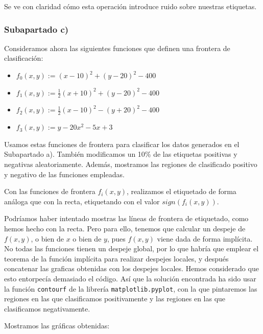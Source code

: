 \documentclass[11pt]{article}
\begin{document}
Se ve con claridad cómo esta operación introduce ruido sobre nuestras etiquetas.

\subsubsection{Subapartado c)}

Consideramos ahora las siguientes funciones que definen una frontera de clasificación:

\begin{itemize}
    \item $f_0(x, y):= (x - 10)^2 + (y - 20)^2 - 400$
    \item $f_1(x, y):= \frac{1}{2} (x + 10)^2 + (y - 20)^2 - 400$
    \item $f_2(x, y):= \frac{1}{2} (x - 10)^2 - (y + 20)^2 - 400$
    \item $f_3(x, y):= y - 20x^2 -5x +3$
\end{itemize}

Usamos estas funciones de frontera para clasificar los datos generados en el Subapartado a). También modificamos un 10\% de las etiquetas positivas y negativas aleatoriamente. Además, mostramos las regiones de clasificado positivo y negativo de las funciones empleadas.

Con las funciones de frontera $f_i(x, y)$, realizamos el etiquetado de forma análoga que con la recta, etiquetando con el valor $sign(f_i(x,y))$.

Podríamos haber intentado mostras las líneas de frontera de etiquetado, como hemos hecho con la recta. Pero para ello, tenemos que calcular un despeje de $f(x, y)$, o bien de $x$ o bien de $y$, pues $f(x, y)$ viene dada de forma implícita. No todas las funciones tienen un despeje global, por lo que habría que emplear el teorema de la función implícita para realizar despejes locales, y después concatenar las graficas obtenidas con los despejes locales. Hemos considerado que esto entorpecía demasiado el código. Así que la solución encontrada ha sido usar la función \lstinline{contourf} de la librería \lstinline{matplotlib.pyplot}, con la que pintaremos las regiones en las que clasificamos positivamente y las regiones en las que clasificamos negativamente.

Mostramos las gráficas obtenidas:
\end{document}
